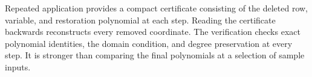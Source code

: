 Repeated application provides a compact certificate consisting of the
deleted row, variable, and restoration polynomial at each step. Reading
the certificate backwards reconstructs every removed coordinate. The
verification checks exact polynomial identities, the domain condition,
and degree preservation at every step. It is stronger than comparing
the final polynomials at a selection of sample inputs.
